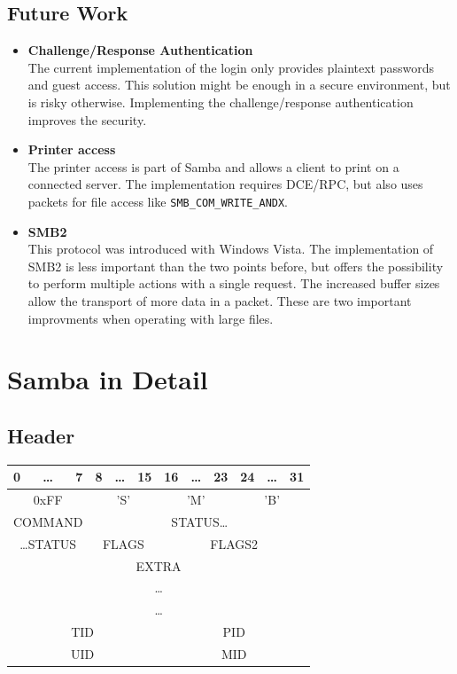 \documentclass[11pt,a4paper]{book}
\begin{document}
\section{Future Work}
\begin{itemize}
\item \textbf{Challenge/Response Authentication} \\ The current implementation of the login only provides plaintext passwords and guest access. This solution might be enough in a secure environment, but is risky otherwise. Implementing the challenge/response authentication improves the security.
\item \textbf{Printer access} \\ The printer access is part of Samba and allows a client to print on a connected server. The implementation requires DCE/RPC, but also uses packets for file access like \texttt{SMB\_COM\_WRITE\_ANDX}.
\item \textbf{SMB2} \\ This protocol was introduced with Windows Vista. The implementation of SMB2 is less important than the two points before, but offers the possibility to perform multiple actions with a single request. The increased buffer sizes allow the transport of more data in a packet. These are two important improvments when operating with large files.
\end{itemize}

\appendix

\chapter{Samba in Detail}

\section{Header}
\begin{center}
	\renewcommand{\tabcolsep}{3mm}
	\begin{tabular}{lcrlcrlcrlcr}
		0 & \ldots & 7 & 8 & \ldots & 15 & 16 & \ldots & 23 & 24 & \ldots & 31 \\
		\hline
		\multicolumn{3}{|c|}{0xFF} &
		\multicolumn{3}{|c|}{'S'} &
		\multicolumn{3}{|c|}{'M'} &
		\multicolumn{3}{|c|}{'B'} \\
		\hline
		\multicolumn{3}{|c|}{COMMAND} &
		\multicolumn{9}{|c|}{STATUS\ldots} \\
		\hline
		\multicolumn{3}{|c|}{\ldots STATUS} &
		\multicolumn{3}{|c|}{FLAGS} &
		\multicolumn{6}{|c|}{FLAGS2} \\
		\hline
		\multicolumn{12}{|c|}{EXTRA} \\
		\multicolumn{12}{|c|}{\ldots} \\
		\multicolumn{12}{|c|}{\ldots} \\
		\hline
		\multicolumn{6}{|c|}{TID} &
		\multicolumn{6}{|c|}{PID} \\
		\hline
		\multicolumn{6}{|c|}{UID} &
		\multicolumn{6}{|c|}{MID} \\
		\hline
	\end{tabular}
\end{center}
\end{document}
